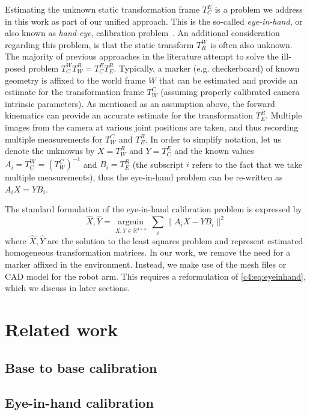 Estimating the unknown static transformation frame $T^E_C$ is a problem we address in this work as part of our unified approach.
This is the so-called \textit{eye-in-hand}, or also known as \textit{hand-eye}, calibration problem~\cite{Horaud95}.
An additional consideration regarding this problem, is that the static transform $T^W_R$ is often also unknown.
The majority of previous approaches in the literature attempt to solve the ill-posed problem $T^W_C T^R_W = T^E_C T^R_E$.
Typically, a marker (e.g. checkerboard) of known geometry is affixed to the world frame $W$ that can be estimated and provide an estimate for the transformation frame $T^C_W$ (assuming properly calibrated camera intrinsic parameters).
As mentioned as an assumption above, the forward kinematics can provide an accurate estimate for the transformation $T^R_E$.
Multiple images from the camera at various joint positions are taken, and thus recording multiple measurements for $T^C_W$ and $T^R_E$.
In order to simplify notation, let us denote the unknowns by $X=T^R_W$ and $Y=T^E_C$ and the known values $A_i=T^W_C = (T^C_W)^{-1}$ and $B_i=T^R_E$ (the subscript $i$ refers to the fact that we take multiple measurements), thus the eye-in-hand problem can be re-written as $A_i X = Y B_i$.

The standard formulation of the eye-in-hand calibration problem is expressed by
\begin{equation}
\label{c4:eq:eyeinhand}
    \widehat{X}, \widehat{Y} = \underset{X, Y\in\mathbb{R}^{4\times 4}}{\text{arg}\min}~\sum_i \| A_i X - Y B_i\|^2
\end{equation}
where $\widehat{X}, \widehat{Y}$ are the solution to the least squares problem and represent estimated homogeneous transformation matrices.
In our work, we remove the need for a marker affixed in the environment.
Instead, we make use of the mesh files or CAD model for the robot arm.
This requires a reformulation of \eqref{c4:eq:eyeinhand}, which we discuss in later sections.

\section{Related work}

\subsection{Base to base calibration}

\subsection{Eye-in-hand calibration}

